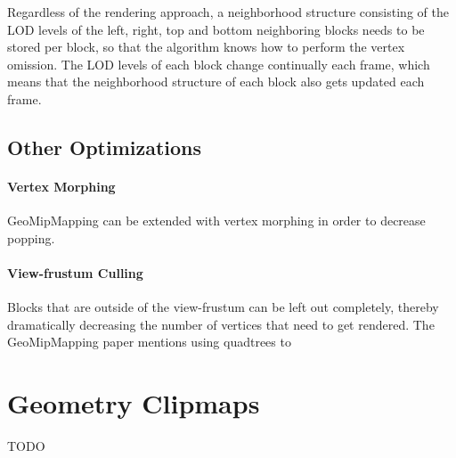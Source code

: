 Regardless of the rendering approach, a neighborhood structure consisting of the LOD levels of the left, right, top and bottom 
neighboring blocks needs to be stored per block, so that the algorithm knows how to perform the vertex omission. The LOD levels of each block change continually each frame, which means 
that the neighborhood structure of each block also gets updated each frame.

\subsection{Other Optimizations}
\paragraph{Vertex Morphing}
GeoMipMapping can be extended with vertex morphing in order to decrease popping.

\paragraph{View-frustum Culling}
Blocks that are outside of the view-frustum can be left out completely, thereby dramatically decreasing the number 
of vertices that need to get rendered.
The GeoMipMapping paper mentions using quadtrees to  


\section{Geometry Clipmaps}
TODO


